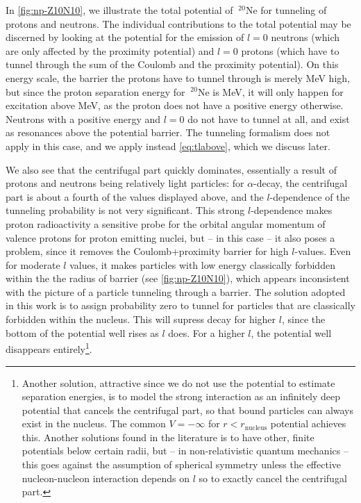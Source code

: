  In \autoref{fig:np-Z10N10}, we illustrate the total potential of $~^{20}\mathrm{Ne}$ for tunneling of protons and neutrons. The individual contributions to the total potential may be discerned by looking at the potential for the emission of $l=0$ neutrons (which are only affected by the proximity potential) and $l=0$ protons (which have to tunnel through the sum of the Coulomb and the proximity potential). %
On this energy scale, the barrier the protons have to tunnel through is merely \unit[2]{MeV} high, but since the proton separation energy for $~^{20}\mathrm{Ne}$ is \unit[12]{MeV}, it will only happen for excitation above \unit[12]{MeV}, as the proton does not have a positive energy otherwise. Neutrons with a positive energy and $l=0$ do not have to tunnel at all, and exist as resonances above the potential barrier. The tunneling formalism does not apply in this case, and we apply instead \eqref{eq:tlabove}, which we discuss later.

We also see that the centrifugal part quickly dominates, essentially a result of protons and neutrons being relatively light particles: for $\alpha$-decay, the centrifugal part is about a fourth of the values displayed above, and the $l$-dependence of the tunneling probability is not very significant\cite{weisskopf:1979}.  
This strong $l$-dependence makes proton radioactivity a sensitive probe for the orbital angular momentum of valence protons for proton emitting nuclei\cite{proton-alpha-proxy:2005}, but -- in this case -- it also poses a problem, since it removes the Coulomb+proximity barrier for high $l$-values. Even for moderate $l$ values, it makes particles with low energy classically forbidden within the the radius of barrier (see \autoref{fig:np-Z10N10}), which appears inconsistent with the picture of a particle tunneling through a barrier.
The solution adopted in this work is to assign probability zero to tunnel for particles that are classically forbidden within the nucleus. This will supress decay for higher $l$, since the bottom of the potential well rises as $l$ does. For a higher $l$, the potential well disappears entirely\footnote{Another solution, attractive since we do not use the potential to estimate separation energies, is to model the strong interaction as an infinitely deep potential that cancels the centrifugal part, so that bound particles can always exist in the nucleus. The common $V=-\infty$ for $r<r_\text{nucleus}$ potential achieves this. Another solutions found in the literature is to have other, finite potentials below certain radii, but -- in non-relativistic quantum mechanics -- this goes against the assumption of spherical symmetry unless the effective nucleon-nucleon interaction depends on $l$ so to exactly cancel the centrifugal part.}.


